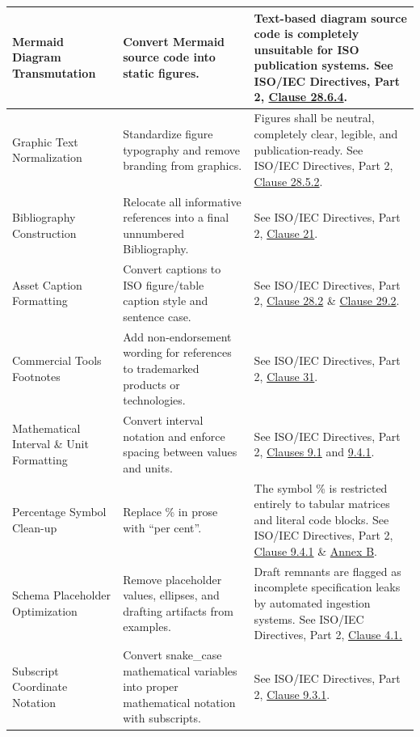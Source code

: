 \documentclass[11pt,a4paper]{article}
\begin{document}
\begin{table}[h]
\begin{tabular}{|l|l|l|}
Mermaid Diagram Transmutation & Convert Mermaid source code into static figures. & Text-based diagram source code is completely unsuitable for ISO publication systems. See ISO/IEC Directives, Part 2, \href{https://www.iso.org/sites/directives/current/part2/index.xhtml\#\_idTextAnchor005}{Clause 28.6.4}. \\ \hline
Graphic Text Normalization & Standardize figure typography and remove branding from graphics. & Figures shall be neutral, completely clear, legible, and publication-ready. See ISO/IEC Directives, Part 2, \href{https://www.iso.org/sites/directives/current/part2/index.xhtml\#\_idTextAnchor005}{Clause 28.5.2}. \\ \hline
Bibliography Construction & Relocate all informative references into a final unnumbered Bibliography. & See ISO/IEC Directives, Part 2, \href{https://www.iso.org/sites/directives/current/part2/index.xhtml\#\_idTextAnchor005}{Clause 21}. \\ \hline
Asset Caption Formatting & Convert captions to ISO figure/table caption style and sentence case. & See ISO/IEC Directives, Part 2, \href{https://www.iso.org/sites/directives/current/part2/index.xhtml\#\_idTextAnchor005}{Clause 28.2} \& \href{https://www.iso.org/sites/directives/current/part2/index.xhtml\#\_idTextAnchor005}{Clause 29.2}. \\ \hline
Commercial Tools Footnotes & Add non-endorsement wording for references to trademarked products or technologies. & See ISO/IEC Directives, Part 2, \href{https://www.iso.org/sites/directives/current/part2/index.xhtml\#\_idTextAnchor005}{Clause 31}. \\ \hline
Mathematical Interval \& Unit Formatting & Convert interval notation and enforce spacing between values and units. & See ISO/IEC Directives, Part 2, \href{https://www.iso.org/sites/directives/current/part2/index.xhtml\#\_idTextAnchor005}{Clauses 9.1} and \href{https://www.iso.org/sites/directives/current/part2/index.xhtml\#\_idTextAnchor005}{9.4.1}. \\ \hline
Percentage Symbol Clean-up & Replace \% in prose with “per cent”. & The symbol \% is restricted entirely to tabular matrices and literal code blocks. See ISO/IEC Directives, Part 2, \href{https://www.iso.org/sites/directives/current/part2/index.xhtml\#\_idTextAnchor005}{Clause 9.4.1} \& \href{https://www.iso.org/sites/directives/current/part2/index.xhtml\#\_idTextAnchor467}{Annex B}. \\ \hline
Schema Placeholder Optimization & Remove placeholder values, ellipses, and drafting artifacts from examples. & Draft remnants are flagged as incomplete specification leaks by automated ingestion systems. See ISO/IEC Directives, Part 2, \href{https://www.iso.org/sites/directives/current/part2/index.xhtml\#\_idTextAnchor040}{Clause 4.1.} \\ \hline
Subscript Coordinate Notation & Convert snake\_case mathematical variables into proper mathematical notation with subscripts. & See ISO/IEC Directives, Part 2, \href{https://www.iso.org/sites/directives/current/part2/index.xhtml\#\_idTextAnchor117}{Clause 9.3.1}. \\ \hline
\end{tabular}
\end{table}
\end{document}
